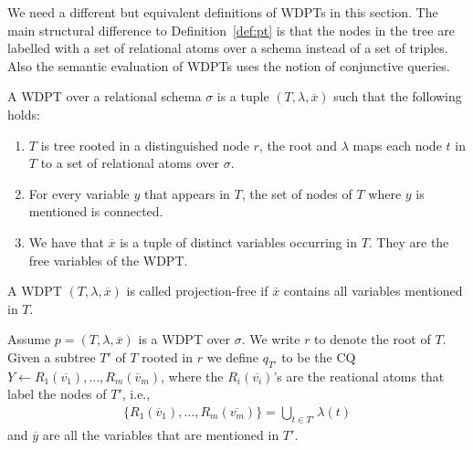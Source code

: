 We need a different but equivalent definitions of WDPTs in this section. The
main structural difference to Definition~\ref{def:pt} is that the nodes in the
tree are labelled with a set
of relational atoms over a schema instead of a set of triples. Also the semantic
evaluation of WDPTs uses the notion of conjunctive queries.

\begin{definition}\label{def:wdpt}
	A WDPT over a relational schema $\sigma$ is a tuple $(T, \lambda, \overline{x})$
	such that the following holds:
	\begin{enumerate}
		\item $T$ is tree rooted in a distinguished node $r$, the root and $\lambda$
			maps each node $t$ in $T$ to a set of relational atoms over $\sigma$.
		\item For every variable $y$ that appears in $T$, the set of nodes of $T$ where
			$y$ is mentioned is connected.
		\item We have that $\overline{x}$ is a tuple of distinct variables occurring in
			$T$. They are the free variables of the WDPT.
	\end{enumerate}
\end{definition}

\begin{definition}
	A WDPT $(T,\lambda, \overline{x})$ is called projection-free if $\overline{x}$
	contains all variables mentioned in $T$.
\end{definition}

\begin{definition}\label{wdptq}
	Assume $p = (T,\lambda,\overline{x})$ is a WDPT over $\sigma$. We write $r$ to
	denote the root of $T$. Given a subtree $T'$ of $T$ rooted in $r$ we define
	$q_{T'}$ to be the CQ $Y \leftarrow R_1(\overline{v_1}), \dots,
	R_m(\overline{v}_m)$, where the $R_i(\overline{v_i})$'s are the reational atoms
	that label the nodes of $T'$, i.e., 
	\begin{align*}
		\{ R_1(\overline{v}_1), \dots, R_m(\overline{v_m}) \} = \bigcup_{t \in T'} \lambda(t) 
	\end{align*} and $\overline{y}$ are all the variables that are mentioned in
	$T'$. 
\end{definition}

